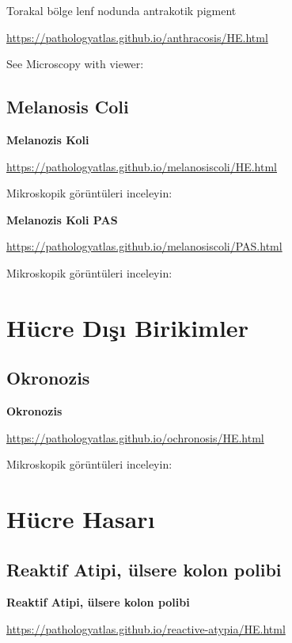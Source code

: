\documentclass[
  letterpaper,
  DIV=11,
  numbers=noendperiod]{scrreprt}
\begin{document}
Torakal bölge lenf nodunda antrakotik pigment

\url{https://pathologyatlas.github.io/anthracosis/HE.html}

See Microscopy with viewer:

\hypertarget{melanosis-coli}{%
\section{Melanosis Coli}\label{melanosis-coli}}

\textbf{Melanozis Koli}

\url{https://pathologyatlas.github.io/melanosiscoli/HE.html}

Mikroskopik görüntüleri inceleyin:

\textbf{Melanozis Koli PAS}

\url{https://pathologyatlas.github.io/melanosiscoli/PAS.html}

Mikroskopik görüntüleri inceleyin:

\hypertarget{huxfccre-dux131ux15fux131-birikimler}{%
\chapter{Hücre Dışı
Birikimler}\label{huxfccre-dux131ux15fux131-birikimler}}

\hypertarget{okronozis}{%
\section{Okronozis}\label{okronozis}}

\textbf{Okronozis}

\url{https://pathologyatlas.github.io/ochronosis/HE.html}

Mikroskopik görüntüleri inceleyin:

\hypertarget{huxfccre-hasarux131}{%
\chapter{Hücre Hasarı}\label{huxfccre-hasarux131}}

\hypertarget{reaktif-atipi-uxfclsere-kolon-polibi}{%
\section{Reaktif Atipi, ülsere kolon
polibi}\label{reaktif-atipi-uxfclsere-kolon-polibi}}

\textbf{Reaktif Atipi, ülsere kolon polibi}

\url{https://pathologyatlas.github.io/reactive-atypia/HE.html}
\end{document}
